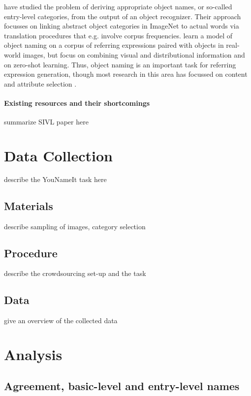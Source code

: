 \documentclass[11pt]{article}
\begin{document}
 have studied the problem of deriving appropriate object names, or so-called entry-level
 categories, from the output of an object recognizer. Their approach focusses on linking abstract object categories in ImageNet to actual words via translation procedures that e.g. involve corpus frequencies. 
  learn a model of object naming on a corpus of referring expressions paired with objects in real-world images, but focus on combining visual and distributional information and on zero-shot learning.
 Thus, object naming is an important task for referring expression generation, though most research in this area has focussed on content and attribute selection \cite{Kazemzadeh2014,gkatzia:2015,zarrieschlang:easy-pre,Maoetal:cocorefexp}.

\paragraph{Existing resources and their shortcomings} summarize SIVL paper here




\section{Data Collection}
\label{sec:task}

describe the YouNameIt task here

\subsection{Materials} describe sampling of images, category selection

\subsection{Procedure} describe the crowdsourcing set-up and the task

\subsection{Data} give an overview of the collected data


\section{Analysis}

\subsection{Agreement, basic-level and entry-level names}
\end{document}
